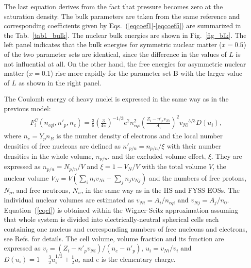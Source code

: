 \documentclass[preprint]{revtex4}
\begin{document}
The last equation derives from the fact that pressure becomes zero at the saturation density.  
The bulk parameters are taken from the  same reference \cite{oyamatsu03} and 
corresponding coefficients given by Eqs.~(\ref{eqcoef1}-\ref{eqcoef5})  are summarized in the Tab.~\ref{tab1_bulk}.
%
The nuclear bulk energies are shown  in Fig.~\ref{fig_blk}.
The left panel indicates that
the bulk energies for symmetric nuclear matter ($x=0.5$) of the two parameter sets
 are identical, since the difference in  the values of $L$ is not influential at all.
On the other hand, the free energies for asymmetric nuclear matter ($x=0.1$) rise more rapidly for the parameter set B with the larger value of $L$ as shown in the right panel.  


{%
{
The Coulomb energy of heavy nuclei is expressed in the same way as in the previous model:
\begin{eqnarray}
F_i^C(n_{eqi},n'_p,n_e)= \frac{3}{5} \left(\frac{3}{4 \pi} \right)^{-1/3}  e^2 n_{eqi}^2 \left(\frac{Z_i - n'_p v_{Ni}}{A_i}\right)^2  {v_{Ni}}^{5/3} D(u_i) ,  \label{eqcl} 
\end{eqnarray}  
where $n_e=Y_p n_B$  is  the number density of electrons and  the local number densities of free nucleons are defined as $n'_{p/n}=n_{p/n}/\xi$
with their number densities in the whole volume, $n_{p/n}$, and  the excluded volume effect, $\xi$.
They are expressed as  
$n_{p/n}=N_{p/n}/V$ and $\xi=1-V_N/V$ with the total volume $V$, the nuclear volume $V_N=V(\sum_i n_i v_{Ni}+\sum_j n_j v_{Nj})$ and the numbers of free protons, $N_p$, and free neutrons, $N_n$, in the same way as in the HS and FYSS EOSs.} 
The individual nuclear volumes are estimated as $v_{Ni}=A_i/n_{eqi}$ and $v_{Nj}=A_j/n_0$.} %
Equation~(\ref{eqcl})  is 
obtained within the Wigner-Seitz approximation assuming 
that whole system is divided into electrically-neutral spherical cells each containing one nucleus and corresponding numbers of free nucleons and electrons, see Refs. \cite{furusawa11,ebel18} for details.
The cell volume, volume fraction and its function are expressed as $v_i = (Z_i - n'_p  v_{Ni})/(n_e-n'_p)$, $u_i=v_{Ni}/v_i$ and $D(u_i)=1-\frac{3}{2}u_i^{1/3}+\frac{1}{2}u_i$ and $e$ is the elementary charge. 
\end{document}
